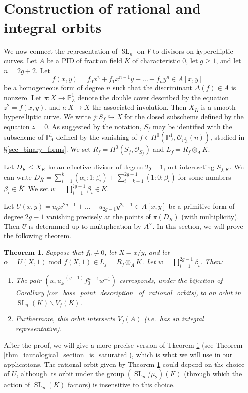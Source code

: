 \documentclass{article} %
\newtheorem{theorem}[proposition]{Theorem}
\numberwithin{equation}{section}
\DeclareMathOperator{\SL}{SL}
\newcommand{\bbP}{\mathbb{P}}
\newcommand{\cO}{\mathcal{O}}
\begin{document}
\section{Construction of rational and integral orbits}\label{sec_integral_orbit_representatives}


We now connect the representation of $\SL_n$ on $V$ to divisors on hyperelliptic curves.
Let $A$ be a PID of fraction field $K$ of characteristic 0, let $g \geq 1$, and let $n = 2g + 2$. Let 
\[ f(x, y) = f_0 x^n + f_1 x^{n-1} y + \dots + f_n y^n \in A[x, y] \]
be a homogeneous form of degree $n$ such that the discriminant $\Delta(f) \in A$ is nonzero. Let $\pi : X \to \mathbb{P}^1_A$ denote the double cover described by the equation $z^2 = f(x, y)$, and $\iota : X \to X$ the associated involution. Then $X_K$ is a smooth hyperelliptic curve. We write $j : S_f \hookrightarrow X$ for the closed subscheme defined by the equation $z = 0$. As suggested by the notation, $S_f$ may be identified with the subscheme of $\bbP^1_A$ defined by the vanishing of $f \in H^0(\bbP^1_A, \cO_{\bbP^1_A}(n))$, studied in \S \ref{sec_binary_forms}. We set $R_f = H^0(S_f, \cO_{S_f})$ and $L_f = R_f \otimes_A K$. 

Let $D_K \leq X_K$ be an effective divisor of degree $2g-1$, not intersecting $S_{f, K}$. We can write $D_{\overline{K}} = \sum_{i=1}^k (\alpha_i : 1 : \beta_i) + \sum_{i=k+1}^{2g-1} (1 : 0 : \beta_i)$ for some numbers $\beta_i \in \overline{K}$. We set $w = \prod_{i=1}^{2g-1} \beta_i \in K$.

Let $U(x, y) = u_0 x^{2g-1} + \dots + u_{2g-1} y^{2g-1} \in A[x, y]$ be a primitive form of degree $2g-1$ vanishing precisely at the points of $\pi(D_{\overline{K}})$ (with multiplicity). Then $U$ is determined up to multiplication by $A^\times$. In this section, we will prove the following theorem.
\begin{theorem}\label{thm_existence_of_integral_representatives}
    Suppose that $f_0 \neq 0$, let $X = x / y$, and let $\alpha = U(X, 1) \text{ mod }f(X, 1) \in L_f = R_f \otimes_A K$. Let $w = \prod_{i=1}^{2g-1} \beta_i$. Then:
    \begin{enumerate}
        \item The pair $(\alpha, u_k^{-(g+1)} f_0^{n-1} w^{-1})$ corresponds, under the bijection of Corollary \ref{cor_base_point_description_of_rational_orbits}, to an  orbit in $\SL_n(K) \backslash V_f(K)$.
        \item Furthermore, this orbit intersects $V_f(A)$ (i.e.\ has an integral representative).
    \end{enumerate}
\end{theorem}
After the proof, we will give a more precise version of Theorem \ref{thm_existence_of_integral_representatives} (see Theorem \ref{thm_tautological_section_is_saturated}), which is what we will use in our applications. The rational orbit given by Theorem \ref{thm_existence_of_integral_representatives} could depend on the choice of $U$, although its orbit under the group $(\SL_n / \mu_2)(K)$ (through which the action of $\SL_n(K)$ factors) is insensitive to this choice. 
\end{document}
